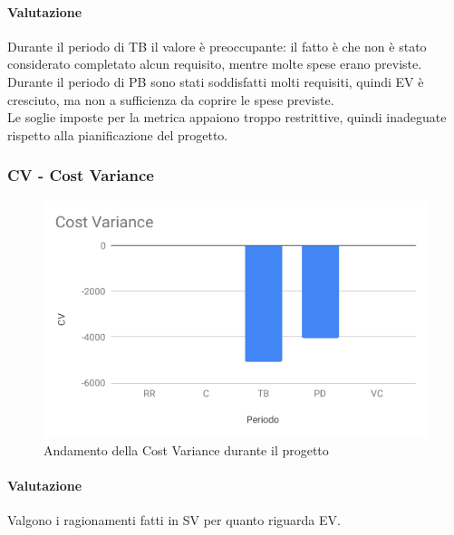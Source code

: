 \paragraph*{Valutazione}
Durante il periodo di TB il valore è preoccupante: il fatto è che non è stato considerato completato alcun requisito, mentre molte spese erano previste.\\
Durante il periodo di PB sono stati soddisfatti molti requisiti, quindi EV è cresciuto, ma non a sufficienza da coprire le spese previste.\\
Le soglie imposte per la metrica appaiono troppo restrittive, quindi inadeguate rispetto alla pianificazione del progetto.

\subsubsection{CV - Cost Variance}
\begin{figure}[H]
	\centering
	\includegraphics[scale=0.7]{res/images/RA/cv.pdf}
	\caption{Andamento della Cost Variance durante il progetto}
\end{figure}
\paragraph*{Valutazione}
Valgono i ragionamenti fatti in SV per quanto riguarda EV.







